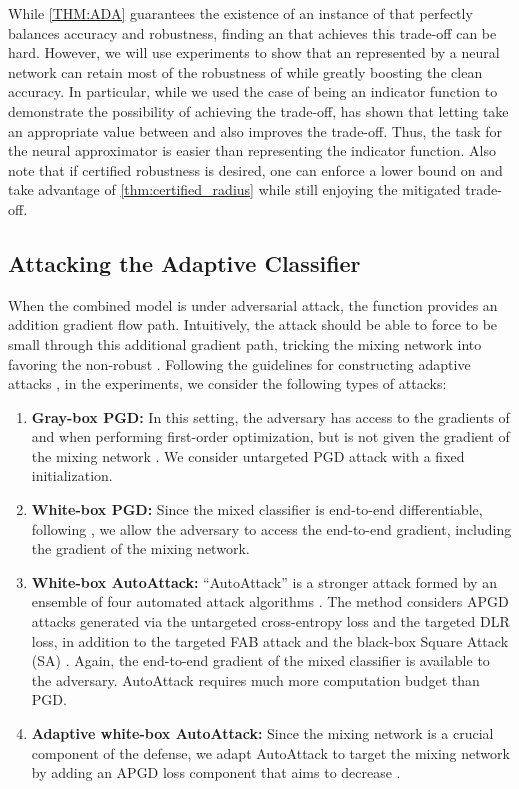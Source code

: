 \documentclass[11pt, letterpaper]{article}
\theoremstyle{plain}
\theoremstyle{definition}
\begin{document}
While \cref{THM:ADA} guarantees the existence of an instance of  that perfectly balances accuracy and robustness, finding an  that achieves this trade-off can be hard. However, we will use experiments to show that an  represented by a neural network can retain most of the robustness of  while greatly boosting the clean accuracy. In particular, while we used the case of  being an indicator function to demonstrate the possibility of achieving the trade-off,  has shown that letting  take an appropriate value between  and  also improves the trade-off. Thus, the task for the neural approximator is easier than representing the indicator function. Also note that if certified robustness is desired, one can enforce a lower bound on  and take advantage of \cref{thm:certified_radius} while still enjoying the mitigated trade-off.


\subsection{Attacking the Adaptive Classifier} \label{sec:adaptive_attack}

When the combined model  is under adversarial attack, the function  provides an addition gradient flow path. Intuitively, the attack should be able to force  to be small through this additional gradient path, tricking the mixing network into favoring the non-robust . Following the guidelines for constructing adaptive attacks \citep{Tramer20}, in the experiments, we consider the following types of attacks:
\begin{enumerate}[label=\textbf{\Alph*}, leftmargin=7.5mm]
\setlength\itemsep{1pt}
	\item \textbf{Gray-box PGD:} In this setting, the adversary has access to the gradients of  and  when performing first-order optimization, but is not given the gradient of the mixing network . We consider untargeted PGD attack with a fixed initialization.
	\item \textbf{White-box PGD:} Since the mixed classifier is end-to-end differentiable, following \citep{Tramer20}, we allow the adversary to access the end-to-end gradient, including the gradient of the mixing network.
	\item \textbf{White-box AutoAttack:} ``AutoAttack'' is a stronger attack formed by an ensemble of four automated attack algorithms \citep{Croce20a}. The method considers APGD attacks generated via the untargeted cross-entropy loss and the targeted DLR loss, in addition to the targeted FAB attack and the black-box Square Attack (SA) \citep{Andriushchenko20}. Again, the end-to-end gradient of the mixed classifier is available to the adversary. AutoAttack requires much more computation budget than PGD.
	\item \textbf{Adaptive white-box AutoAttack:} Since the mixing network is a crucial component of the defense, we adapt AutoAttack to target the mixing network by adding an APGD loss component that aims to decrease .
\end{enumerate}
\end{document}
